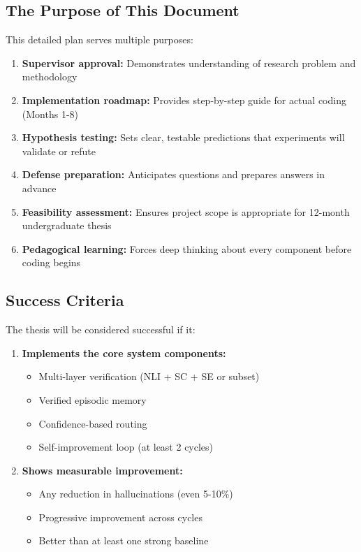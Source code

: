 \documentclass[12pt,a4paper]{article}
\theoremstyle{definition}
\begin{document}
\begin{tcolorbox}[
    colback=yellow!10!white,
    colframe=orange!75!black,
    title={\Large\textbf{IMPORTANT: About the Numbers in This Document}},
    breakable,
    enhanced,
    fontupper=\normalsize
]
\subsection*{The Purpose of This Document}

This detailed plan serves multiple purposes:

\begin{enumerate}
    \item \textbf{Supervisor approval:} Demonstrates understanding of research problem and methodology
    
    \item \textbf{Implementation roadmap:} Provides step-by-step guide for actual coding (Months 1-8)
    
    \item \textbf{Hypothesis testing:} Sets clear, testable predictions that experiments will validate or refute
    
    \item \textbf{Defense preparation:} Anticipates questions and prepares answers in advance
    
    \item \textbf{Feasibility assessment:} Ensures project scope is appropriate for 12-month undergraduate thesis
    
    \item \textbf{Pedagogical learning:} Forces deep thinking about every component before coding begins
\end{enumerate}

\subsection*{Success Criteria}

The thesis will be considered successful if it:

\begin{enumerate}
    \item \textbf{Implements the core system components:}
    \begin{itemize}
        \item Multi-layer verification (NLI + SC + SE or subset)
        \item Verified episodic memory
        \item Confidence-based routing
        \item Self-improvement loop (at least 2 cycles)
    \end{itemize}
    
    \item \textbf{Shows measurable improvement:}
    \begin{itemize}
        \item Any reduction in hallucinations (even 5-10\%)
        \item Progressive improvement across cycles
        \item Better than at least one strong baseline
    \end{itemize}
    

\end{enumerate}
\end{tcolorbox}
\end{document}
